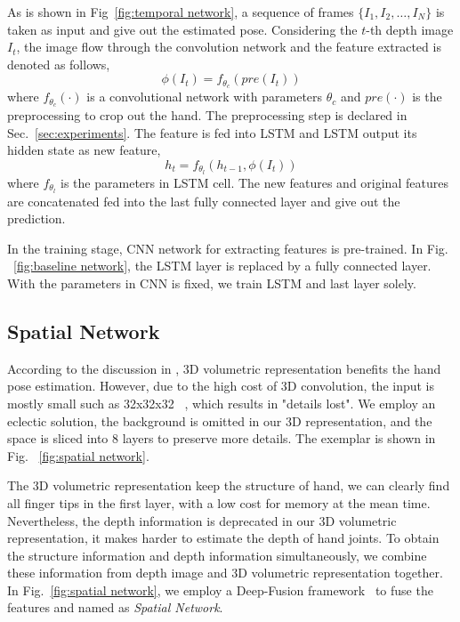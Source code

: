 \documentclass[journal,comsoc]{IEEEtran}
\begin{document}
As is shown in Fig~\ref{fig:temporal network}, a sequence of frames $\{I_1, I_2, \dots, I_N\}$ is
taken as input and give out the estimated pose. Considering the $t$-th depth image $I_t$, the image
flow through the convolution network and the feature extracted is denoted as follows,
\begin{equation}
\phi(I_t)=f_{\theta_c}(pre(I_t))
\end{equation}
where $f_{\theta_c}(\cdot)$ is a convolutional network with parameters $\theta_c$ and
$pre(\cdot)$ is the preprocessing to crop out the hand. The preprocessing step is declared
in Sec.~\ref{sec:experiments}. The feature is fed into LSTM and LSTM output its hidden
state as new feature,
\begin{equation}
h_t=f_{\theta_l}(h_{t-1}, \phi(I_t))
\end{equation}
where $f_{\theta_l}$ is the parameters in LSTM cell. The new features and original features
are concatenated fed into the last fully connected layer and give out the prediction.

In the training stage, CNN network for extracting features is pre-trained. In Fig.
~\ref{fig:baseline network}, the LSTM layer is replaced by a fully connected layer.
With the parameters in CNN is fixed, we train LSTM and last layer solely.

\subsection{Spatial Network}\label{sec:spatial network}
According to the discussion in \cite{supancic2015depth, deng2017hand3d, ge2017_3D}, 3D
volumetric representation benefits the hand pose estimation. However, due to the high
cost of 3D convolution, the input is mostly small such as 32x32x32
~\cite{deng2017hand3d, ge2017_3D}, which results in "details lost". We employ an eclectic
solution, the background is omitted in our 3D representation, and the space is sliced
into 8 layers to preserve more details. The exemplar is shown in Fig.
~\ref{fig:spatial network}.

The 3D volumetric representation keep the structure of hand, we can clearly find all
finger tips in the first layer, with a low cost for memory at the mean time. Nevertheless,
the depth information is deprecated in our 3D volumetric representation, it makes harder
to estimate the depth of hand joints. To obtain the structure information and depth
information simultaneously, we combine these information from depth image and 3D volumetric
representation together. In Fig.~\ref{fig:spatial network}, we employ a Deep-Fusion
framework~\cite{chen2016multi} to fuse the features and named as \emph{Spatial Network}.
\end{document}

